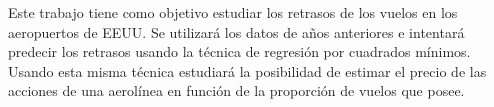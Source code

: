 Este trabajo tiene como objetivo estudiar los retrasos de los vuelos en los aeropuertos de EEUU\@.
Se utilizar\'a los datos de a\~nos anteriores e intentar\'a predecir los retrasos usando la t\'ecnica
de regresi\'on por cuadrados m\'inimos.
Usando esta misma t\'ecnica estudiar\'a la posibilidad de estimar el precio de las acciones de una aerol\'inea
en funci\'on de la proporci\'on de vuelos que posee.
